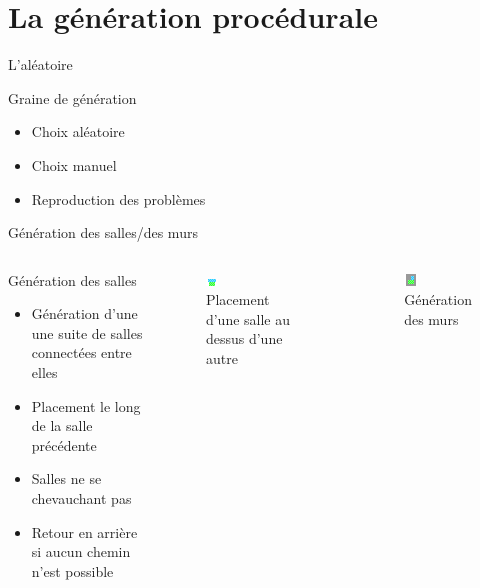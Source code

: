 \documentclass{beamer}
\begin{document}
{\section{La génération procédurale}
\begin{frame}{L'al\'eatoire}
    \begin{block}{Graine de génération}
        \begin{itemize}
            \item[\bullet] Choix aléatoire
            \item[\bullet] Choix manuel
            \item[\bullet] Reproduction des problèmes
        \end{itemize}
    \end{block}
\end{frame}

\begin{frame}{Génération des salles/des murs}
    \begin{columns}
        \begin{block}{Génération des salles}
            \begin{itemize}
                \item[\bullet] Génération d'une une suite de salles connectées entre elles
                \item[\bullet] Placement le long de la salle précédente
                \item[\bullet] Salles ne se chevauchant pas
                \item[\bullet] Retour en arrière si aucun chemin n'est possible
            \end{itemize}
        \end{block}
        \begin{figure}
            \centering
            \includegraphics[height=0.2\textheight]{room_placement}
            \caption{Placement d'une salle au dessus d'une autre}
        \end{figure}
        \begin{figure}
            \centering
            \includegraphics[height=0.2\textheight]{filling_the_world}
            \caption{Génération des murs}
        \end{figure}
    \end{columns}
\end{frame}

}
\end{document}
